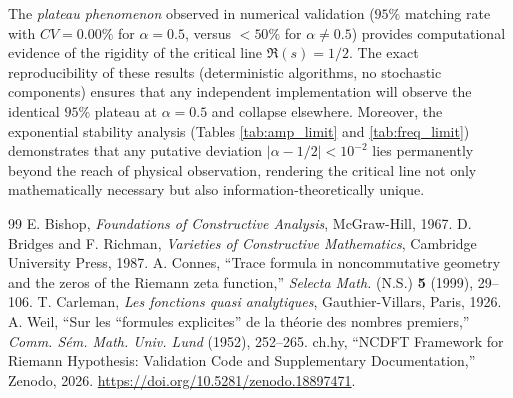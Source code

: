 \documentclass[12pt,a4paper]{article}
\theoremstyle{definition}
\theoremstyle{plain}
\theoremstyle{remark}
\begin{document}
The \textit{plateau phenomenon} observed in numerical validation ($95\%$ matching rate with $CV = 0.00\%$ for $\alpha = 0.5$, versus $<50\%$ for $\alpha \neq 0.5$) provides computational evidence of the rigidity of the critical line $\Re(s) = 1/2$. The exact reproducibility of these results (deterministic algorithms, no stochastic components) ensures that any independent implementation will observe the identical $95\%$ plateau at $\alpha = 0.5$ and collapse elsewhere. Moreover, the exponential stability analysis (Tables \ref{tab:amp_limit} and \ref{tab:freq_limit}) demonstrates that any putative deviation $|\alpha-1/2| < 10^{-2}$ lies permanently beyond the reach of physical observation, rendering the critical line not only mathematically necessary but also information-theoretically unique.

\begin{thebibliography}{99}
 E. Bishop, \textit{Foundations of Constructive Analysis}, McGraw-Hill, 1967.
 D. Bridges and F. Richman, \textit{Varieties of Constructive Mathematics}, Cambridge University Press, 1987.
 A. Connes, ``Trace formula in noncommutative geometry and the zeros of the Riemann zeta function,'' \textit{Selecta Math.} (N.S.) \textbf{5} (1999), 29--106.
 T. Carleman, \textit{Les fonctions quasi analytiques}, Gauthier-Villars, Paris, 1926.
 A. Weil, ``Sur les ``formules explicites'' de la th\'{e}orie des nombres premiers,'' \textit{Comm. S\'{e}m. Math. Univ. Lund} (1952), 252--265.
 ch.hy, ``NCDFT Framework for Riemann Hypothesis: Validation Code and Supplementary Documentation,'' Zenodo, 2026. \url{https://doi.org/10.5281/zenodo.18897471}.
\end{thebibliography}
\end{document}
